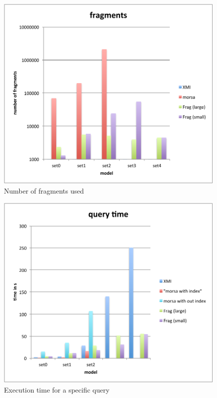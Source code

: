 \begin{figure}
  \centering
  \includegraphics[width=0.65\linewidth]{figures/grabatsFragments}
  \caption{Number of fragments used}
\end{figure}

\begin{figure}
  \centering
  \includegraphics[width=0.65\linewidth]{figures/grabatsQuery}
  \caption{Execution time for a specific query}
\end{figure}